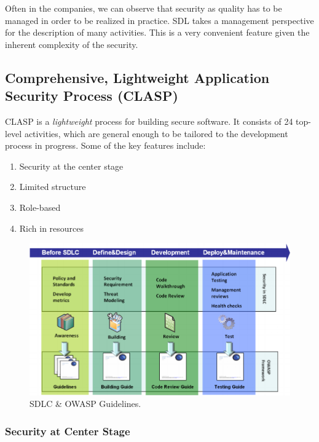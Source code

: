 \documentclass[12pt,a4,twoside]{article}
\begin{document}
Often in the companies, we can observe that security as quality has to be managed in order to be realized in practice. SDL takes a management perspective for the description of many activities. This is a very convenient feature given the inherent complexity of the security.

\subsection{Comprehensive, Lightweight Application Security Process (CLASP) \cite{on_secure_software}}

CLASP is a \textit{lightweight} process for building secure software. It consists of 24 top-level activities, which are general enough to be tailored to the development process in progress. Some of the key features include:

\begin{enumerate}
    \item Security at the center stage
    \item Limited structure
    \item Role-based
    \item Rich in resources
\end{enumerate}

\begin{figure}[h]
\centering
\includegraphics[width=1\textwidth]{figures/owasp_clasp.png}
\caption{SDLC \& OWASP Guidelines. \cite{owasp_clasp}}
\label{fig:sdlc_owasp}
\end{figure}

\subsubsection{Security at Center Stage}
\end{document}
